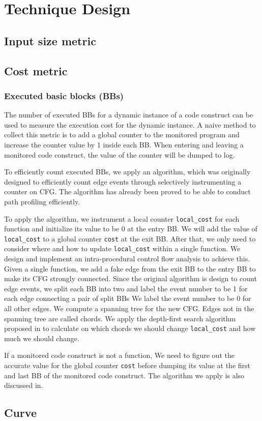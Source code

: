 \section{Technique Design}
\label{sec:design}

\subsection{Input size metric}


\subsection{Cost metric}

\subsubsection{Executed basic blocks (BBs)}
The number of executed BBs for a dynamic instance of a code construct
can be used to measure the execution cost for the dynamic instance. 
A naive method to collect this metric is to add a global counter 
to the monitored program and increase the counter value by 1 inside each BB.  
When entering and leaving a monitored code construct, 
the value of the counter will be dumped to log.

To efficiently count executed BBs, 
we apply an algorithm, which was originally designed to 
efficiently count edge events through selectively instrumenting a counter 
on CFG\cite{event-counting}.
The algorithm has already been proved to be able to 
conduct path profiling efficiently\cite{peter-ase,path-profiling}. 



To apply the algorithm,
we instrument a local counter \texttt{local\_cost} for each function
and initialize its value to be 0 at the entry BB. 
We will add the value of \texttt{local\_cost} to a global counter \texttt{cost} 
at the exit BB.
After that, we only need to consider where 
and how to update \texttt{local\_cost} 
within a single function.
We design and implement an intra-procedural control flow analysis
to achieve this.
Given a single function,
we add a fake edge from the exit BB to the entry BB 
to make its CFG strongly connected. 
Since the original algorithm is design to count edge events,
we split each BB into two 
and label the event number to be 1 for each edge connecting a pair of split BBs 
We label the event number to be 0 for all other edges.
We compute a spanning tree\cite{spanning} for the new CFG.
Edges not in the spanning tree are called chords.
We apply the depth-first search algorithm proposed in\cite{event-counting} 
to calculate on which chords we should change 
\texttt{local\_cost} 
and how much we should change.

If a monitored code construct is not a function,
We need to figure out the accurate value for the global counter \texttt{cost} 
before dumping its value 
at the first and last BB of the monitored code construct.
The algorithm we apply is also discussed in\cite{event-counting}.




\subsection{Curve}